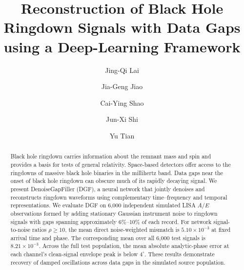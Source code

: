 \documentclass[10pt,prd,aps,a4paper,twocolumn,superscriptaddress,nofootinbib,floatfix]{revtex4-2}
\begin{document}
\title{Reconstruction of Black Hole Ringdown Signals with Data Gaps using a Deep-Learning Framework}
\author{Jing-Qi Lai}
\author{Jia-Geng Jiao}
\author{Cai-Ying Shao}

\author{Jun-Xi Shi}
\author{Yu Tian}

\begin{abstract}
Black hole ringdown carries information about the remnant mass and spin and provides a basis for tests of general relativity. Space-based detectors offer access to the ringdowns of massive black hole binaries in the millihertz band. Data gaps near the onset of black hole ringdown can obscure much of its rapidly decaying signal. We present DenoiseGapFiller (DGF), a neural network that jointly denoises and reconstructs ringdown waveforms using complementary time--frequency and temporal representations. We evaluate DGF on 6,000 independent simulated LISA $A/E$ observations formed by adding stationary Gaussian instrument noise to ringdown signals with gaps spanning approximately 6\%--10\% of each record. For network signal-to-noise ratios $\rho\ge10$, the mean direct noise-weighted mismatch is $5.10\times10^{-3}$ at fixed arrival time and phase. The corresponding mean over all 6,000 test signals is $8.21\times10^{-3}$. Across the full test population, the mean absolute analytic-phase error at each channel's clean-signal envelope peak is below $4^\circ$. These results demonstrate recovery of damped oscillations across data gaps in the simulated source population.
\end{abstract}

\maketitle
\end{document}
